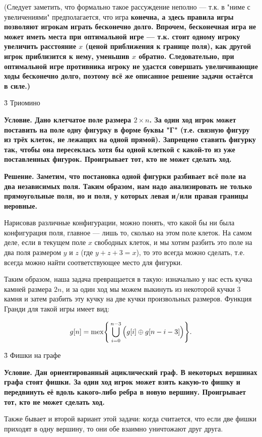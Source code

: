 (Следует заметить, что формально такое рассуждение неполно --- т.к. в "ниме с увеличениями" предполагается, что игра \bf{конечна}, а здесь правила игры позволяют игрокам играть бесконечно долго. Впрочем, бесконечная игра не может иметь места при оптимальной игре --- т.к. стоит одному игроку увеличить расстояние $x$ (ценой приближения к границе поля), как другой игрок приблизится к нему, уменьшив $x$ обратно. Следовательно, при оптимальной игре противника игроку не удастся совершать увеличивающие ходы бесконечно долго, поэтому всё же описанное решение задачи остаётся в силе.)


\h3{ Триомино }

\bf{Условие}. Дано клетчатое поле размера $2 \times n$. За один ход игрок может поставить на поле одну фигурку в форме буквы "Г" (т.е. связную фигуру из трёх клеток, не лежащих на одной прямой). Запрещено ставить фигурку так, чтобы она пересеклась хотя бы одной клеткой с какой-то из уже поставленных фигурок. Проигрывает тот, кто не может сделать ход.

\bf{Решение}. Заметим, что постановка одной фигурки разбивает всё поле на два независимых поля. Таким образом, нам надо анализировать не только прямоугольные поля, но и поля, у которых левая и/или правая границы неровные.

Нарисовав различные конфигурации, можно понять, что какой бы ни была конфигурация поля, главное --- лишь то, сколько на этом поле клеток. На самом деле, если в текущем поле $x$ свободных клеток, и мы хотим разбить это поле на два поля размером $y$ и $z$ (где $y+z+3 = x$), то это всегда можно сделать, т.е. всегда можно найти соответствующее место для фигурки.

Таким образом, наша задача превращается в такую: изначально у нас есть кучка камней размера $2n$, и за один ход мы можем выкинуть из некоторой кучки $3$ камня и затем разбить эту кучку на две кучки произвольных размеров. Функция Гранди для такой игры имеет вид:

$$ g[n] = {\rm mex} \Bigg\{ \bigcup_{i=0}^{n-3} \Big( g[i] \oplus g[n-i-3] \Big) \Bigg\}. $$


\h3{ Фишки на графе }

\bf{Условие}. Дан ориентированный ациклический граф. В некоторых вершинах графа стоят фишки. За один ход игрок может взять какую-то фишку и передвинуть её вдоль какого-либо ребра в новую вершину. Проигрывает тот, кто не может сделать ход.

Также бывает и второй вариант этой задачи: когда считается, что если две фишки приходят в одну вершину, то они обе взаимно уничтожают друг друга.

